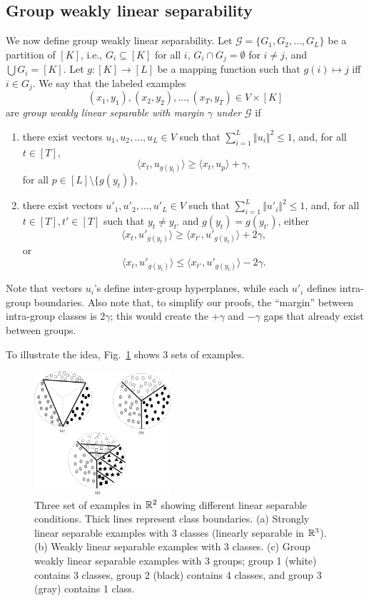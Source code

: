 \subsection{Group weakly linear separability}
We now define group weakly linear separability.
Let ${\mathcal G}=\{G_1,G_2,\ldots,G_L\}$ be a partition of $[K]$, i.e., $G_i\subseteq [K]$ for all $i$,
$G_i\cap G_j=\emptyset$ for $i\neq j$, and $\bigcup G_i = [K]$.  
Let $g:[K] \rightarrow [L]$ be a mapping function such that $g(i)\mapsto j$ iff $i\in G_j$.
We say that the labeled examples
\[
(x_1,y_1),(x_2,y_2),\ldots,(x_T,y_T)\in V\times[K]
\]
are {\em group weakly linear separable with margin $\gamma$ under ${\mathcal G}$} 
if 
\begin{enumerate}
\item there exist vectors $u_1,u_2,\ldots,u_L\in V$ such that
$\sum_{i=1}^L \Vert u_i \Vert^2\leq 1$, and, for all $t\in[T]$, 
\[
\langle x_t, u_{g(y_t)}\rangle \geq \langle x_t, u_p\rangle + \gamma,
\]
for all $p\in [L] \setminus\{g(y_t)\}$, 
%
\item there exist vectors $u'_1,u'_2,\ldots,u'_L\in V$ such that
$\sum_{i=1}^L \Vert u'_i \Vert^2\leq 1$, and, for all $t\in[T], t'\in[T]$ such that $y_t\neq y_{t'}$ and $g(y_t)=g(y_{t'})$,
either
\[
\langle x_t, u'_{g(y_t)}\rangle \geq \langle x_{t'}, u'_{g(y_t)}\rangle + 2\gamma,
\]
or
\[
\langle x_t, u'_{g(y_t)}\rangle \leq \langle x_{t'}, u'_{g(y_t)}\rangle - 2\gamma.
\]
\end{enumerate}

Note that vectors $u_i$'s define inter-group hyperplanes, while each
$u'_i$ defines intra-group boundaries.  Also note that, to simplify
our proofs, the ``margin'' between intra-group classes is $2\gamma$;
this would create the $+\gamma$ and $-\gamma$ gaps that already exist
between groups.

To illustrate the idea, Fig.~\ref{fig:sep-examples} shows 3 sets of examples.  

\begin{figure}[h]
\centering
\includegraphics[width=0.45\textwidth]{sep-examples.png}
\caption{Three set of examples in ${\mathbb{R}}^2$ showing different linear separable conditions. Thick lines represent class boundaries. (a) Strongly linear separable examples with 3 classes (linearly separable in ${\mathbb{R}}^3$).  (b) Weakly linear separable examples with 3 classes.  (c) Group weakly linear separable examples with 3 groups; group 1 (white) contains 3 classes, group 2 (black) contains 4 classes, and group 3 (gray) contains 1 class.}
\label{fig:sep-examples}
\end{figure}

